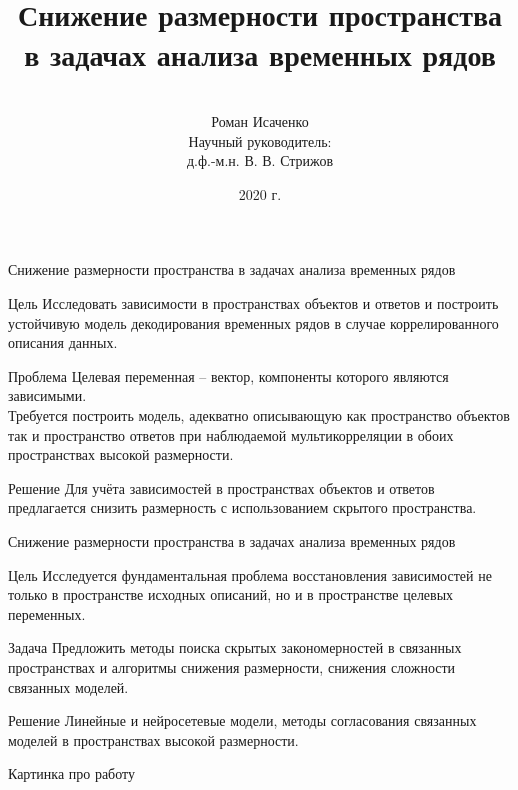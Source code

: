 \documentclass[9pt]{beamer}
\title[\hbox to 56mm{  \hfill\insertframenumber\,/\,\inserttotalframenumber}]
{\\ \vspace{1.5cm} Снижение размерности пространства \\ в задачах анализа временных рядов}
\author[Роман Исаченко]{\\ 
	\vspace{.4cm}
	Роман Исаченко \\
	\vspace{3mm}
	{\footnotesize Научный руководитель: \\
	д.ф.-м.н. В. В. Стрижов}}
\institute[МФТИ(ГУ)]{
Московский физико-технический институт\\
Факультет управления и прикладной математики\\
Кафедра <<Интеллектуальные системы>>}
\date{2020 г.}
\begin{document}
\begin{frame}
\titlepage
\end{frame}
\begin{frame}{Снижение размерности пространства в задачах анализа временных рядов}
	\begin{block}{Цель}
		Исследовать зависимости в пространствах объектов и ответов и построить устойчивую модель декодирования временных рядов в случае коррелированного описания данных.
	\end{block}
	\begin{block}{Проблема}
		Целевая переменная -- вектор, компоненты которого являются зависимыми. \\
		Требуется построить модель, адекватно описывающую как пространство объектов так и пространство ответов при наблюдаемой мультикорреляции в обоих пространствах высокой размерности. 
	\end{block}
	\begin{block}{Решение}
		Для учёта зависимостей в пространствах объектов и ответов предлагается снизить размерность с использованием скрытого пространства. 
	\end{block}
\end{frame}
\begin{frame}{Снижение размерности пространства в задачах анализа временных рядов}
	\begin{block}{Цель}
		Исследуется фундаментальная проблема восстановления зависимостей не только в пространстве исходных описаний, но и в пространстве целевых переменных.
	\end{block}
	\begin{block}{Задача}
		Предложить методы поиска скрытых закономерностей в связанных пространствах и алгоритмы снижения размерности, снижения сложности связанных моделей.
	\end{block}
	\begin{block}{Решение}
		Линейные и нейросетевые модели, методы согласования связанных моделей в пространствах высокой размерности.
	\end{block}
\end{frame}
\begin{frame}{Картинка про работу}
    
\end{frame}
\end{document}
